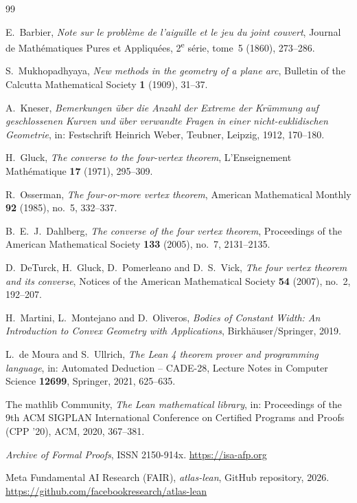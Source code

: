 \documentclass[11pt]{article}
\theoremstyle{definition}
\theoremstyle{remark}
\begin{document}
\begin{thebibliography}{99}

E.~Barbier,
\emph{Note sur le probl\`eme de l'aiguille et le jeu du joint couvert},
Journal de Math\'ematiques Pures et Appliqu\'ees, 2\textsuperscript{e} s\'erie, tome~5 (1860), 273--286.

S.~Mukhopadhyaya,
\emph{New methods in the geometry of a plane arc},
Bulletin of the Calcutta Mathematical Society \textbf{1} (1909), 31--37.

A.~Kneser,
\emph{Bemerkungen \"uber die Anzahl der Extreme der Kr\"ummung auf geschlossenen Kurven und \"uber verwandte Fragen in einer nicht-euklidischen Geometrie},
in: Festschrift Heinrich Weber, Teubner, Leipzig, 1912, 170--180.

H.~Gluck,
\emph{The converse to the four-vertex theorem},
L'Enseignement Math\'ematique \textbf{17} (1971), 295--309.

R.~Osserman,
\emph{The four-or-more vertex theorem},
American Mathematical Monthly \textbf{92} (1985), no.~5, 332--337.

B.~E.~J.~Dahlberg,
\emph{The converse of the four vertex theorem},
Proceedings of the American Mathematical Society \textbf{133} (2005), no.~7, 2131--2135.

D.~DeTurck, H.~Gluck, D.~Pomerleano and D.~S.~Vick,
\emph{The four vertex theorem and its converse},
Notices of the American Mathematical Society \textbf{54} (2007), no.~2, 192--207.

H.~Martini, L.~Montejano and D.~Oliveros,
\emph{Bodies of Constant Width: An Introduction to Convex Geometry with Applications},
Birkh\"auser/Springer, 2019.

L.~de Moura and S.~Ullrich,
\emph{The Lean 4 theorem prover and programming language},
in: Automated Deduction -- CADE-28, Lecture Notes in Computer Science \textbf{12699}, Springer, 2021, 625--635.

The mathlib Community,
\emph{The Lean mathematical library},
in: Proceedings of the 9th ACM SIGPLAN International Conference on Certified Programs and Proofs (CPP '20), ACM, 2020, 367--381.

\emph{Archive of Formal Proofs}, ISSN 2150-914x. \url{https://isa-afp.org}

Meta Fundamental AI Research (FAIR),
\emph{atlas-lean}, GitHub repository, 2026. \url{https://github.com/facebookresearch/atlas-lean}


\end{thebibliography}
\end{document}
